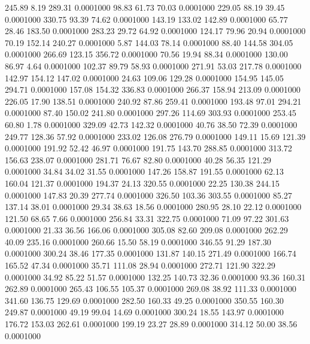  245.89    8.19  289.31   0.0001000
  98.83   61.73   70.03   0.0001000
 229.05   88.19   39.45   0.0001000
 330.75   93.39   74.62   0.0001000
 143.19  133.02  142.89   0.0001000
  65.77   28.46  183.50   0.0001000
 283.23   29.72   64.92   0.0001000
 124.17   79.96   20.94   0.0001000
  70.19  152.14  240.27   0.0001000
   5.87  144.03   78.14   0.0001000
  88.40  144.58  304.05   0.0001000
 266.69  123.15  356.72   0.0001000
  70.56   19.94   88.34   0.0001000
 130.00   86.97    4.64   0.0001000
 102.37   89.79   58.93   0.0001000
 271.91   53.03  217.78   0.0001000
 142.97  154.12  147.02   0.0001000
  24.63  109.06  129.28   0.0001000
 154.95  145.05  294.71   0.0001000
 157.08  154.32  336.83   0.0001000
 266.37  158.94  213.09   0.0001000
 226.05   17.90  138.51   0.0001000
 240.92   87.86  259.41   0.0001000
 193.48   97.01  294.21   0.0001000
  87.40  150.02  241.80   0.0001000
 297.26  114.69  303.93   0.0001000
 253.45   60.80    1.78   0.0001000
 329.09   42.73  142.32   0.0001000
  40.76   38.50   72.39   0.0001000
 249.77  128.36   57.92   0.0001000
 233.02  126.08  276.79   0.0001000
 149.11   15.69  121.39   0.0001000
 191.92   52.42   46.97   0.0001000
 191.75  143.70  288.85   0.0001000
 313.72  156.63  238.07   0.0001000
 281.71   76.67   82.80   0.0001000
  40.28   56.35  121.29   0.0001000
  34.84   34.02   31.55   0.0001000
 147.26  158.87  191.55   0.0001000
  62.13  160.04  121.37   0.0001000
 194.37   24.13  320.55   0.0001000
  22.25  130.38  244.15   0.0001000
 147.83   20.39  277.74   0.0001000
 326.50  103.36  303.55   0.0001000
  85.27  137.14   38.01   0.0001000
  29.34   38.63   18.56   0.0001000
 280.95   28.10   22.12   0.0001000
 121.50   68.65    7.66   0.0001000
 256.84   33.31  322.75   0.0001000
  71.09   97.22  301.63   0.0001000
  21.33   36.56  166.06   0.0001000
 305.08   82.60  209.08   0.0001000
 262.29   40.09  235.16   0.0001000
 260.66   15.50   58.19   0.0001000
 346.55   91.29  187.30   0.0001000
 300.24   38.46  177.35   0.0001000
 131.87  140.15  271.49   0.0001000
 166.74  165.52   47.34   0.0001000
  35.71  111.08   28.94   0.0001000
 272.71  121.90  322.29   0.0001000
  34.92   85.22   51.57   0.0001000
 132.25  140.73   32.36   0.0001000
  93.36  160.31  262.89   0.0001000
 265.43  106.55  105.37   0.0001000
 269.08   38.92  111.33   0.0001000
 341.60  136.75  129.69   0.0001000
 282.50  160.33   49.25   0.0001000
 350.55  160.30  249.87   0.0001000
  49.19   99.04   14.69   0.0001000
 300.24   18.55  143.97   0.0001000
 176.72  153.03  262.61   0.0001000
 199.19   23.27   28.89   0.0001000
 314.12   50.00   38.56   0.0001000
